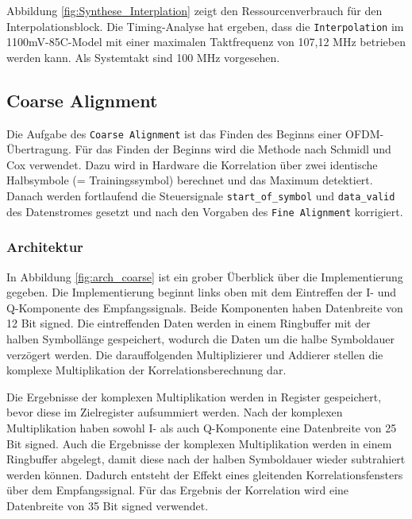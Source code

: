 Abbildung \ref{fig:Synthese_Interplation} zeigt den Ressourcenverbrauch für den Interpolationsblock.
Die Timing-Analyse hat ergeben, dass die \texttt{Interpolation} im 1100mV-85C-Model mit einer maximalen Taktfrequenz von 107,12 MHz betrieben werden kann. Als Systemtakt sind 100 MHz vorgesehen.

\subsection{Coarse Alignment}
Die Aufgabe des \texttt{Coarse Alignment} ist das Finden des Beginns einer OFDM-Übertragung. Für das Finden der Beginns wird die Methode nach Schmidl und Cox verwendet. Dazu wird in Hardware die Korrelation über zwei identische Halbsymbole (= Trainingssymbol) berechnet und das Maximum detektiert. Danach werden fortlaufend die Steuersignale \texttt{start\_of\_symbol} und \texttt{data\_valid} des Datenstromes gesetzt und nach den Vorgaben des \texttt{Fine Alignment} korrigiert.

\subsubsection{Architektur}

In Abbildung \ref{fig:arch_coarse} ist ein grober Überblick über die Implementierung gegeben. Die Implementierung beginnt links oben mit dem Eintreffen der I- und Q-Komponente des Empfangssignals. Beide Komponenten haben Datenbreite von 12 Bit signed. Die eintreffenden Daten werden in einem Ringbuffer mit der halben Symbollänge gespeichert, wodurch die Daten um die halbe Symboldauer verzögert werden. Die darauffolgenden Multiplizierer und Addierer stellen die komplexe Multiplikation der Korrelationsberechnung dar.

\begin{center}
\end{center}

Die Ergebnisse der komplexen Multiplikation werden in Register gespeichert, bevor diese im Zielregister aufsummiert werden. Nach der komplexen Multiplikation haben sowohl I- als auch Q-Komponente eine Datenbreite von 25 Bit signed. Auch die Ergebnisse der komplexen Multiplikation werden in einem Ringbuffer abgelegt, damit diese nach der halben Symboldauer wieder subtrahiert werden können. Dadurch entsteht der Effekt eines gleitenden Korrelationsfensters über dem Empfangssignal. Für das Ergebnis der Korrelation wird eine Datenbreite von 35 Bit signed verwendet. \vspace{0.5 cm}

